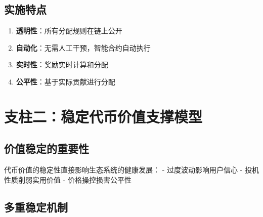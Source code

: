 \documentclass[
  Letterpaper,
]{scrbook}
\providecommand{\tightlist}{%
  \setlength{\itemsep}{0pt}\setlength{\parskip}{0pt}}
\begin{document}
\subsection{实施特点}\label{ux5b9eux65bdux7279ux70b9}

\begin{enumerate}
\def\labelenumi{\arabic{enumi}.}
\tightlist
\item
  \textbf{透明性}：所有分配规则在链上公开
\item
  \textbf{自动化}：无需人工干预，智能合约自动执行
\item
  \textbf{实时性}：奖励实时计算和分配
\item
  \textbf{公平性}：基于实际贡献进行分配
\end{enumerate}

\section{支柱二：稳定代币价值支撑模型}\label{ux652fux67f1ux4e8cux7a33ux5b9aux4ee3ux5e01ux4ef7ux503cux652fux6491ux6a21ux578b}

\subsection{价值稳定的重要性}\label{ux4ef7ux503cux7a33ux5b9aux7684ux91cdux8981ux6027}

代币价值的稳定性直接影响生态系统的健康发展： - 过度波动影响用户信心 -
投机性质削弱实用价值 - 价格操控损害公平性

\subsection{多重稳定机制}\label{ux591aux91cdux7a33ux5b9aux673aux5236}
\end{document}
